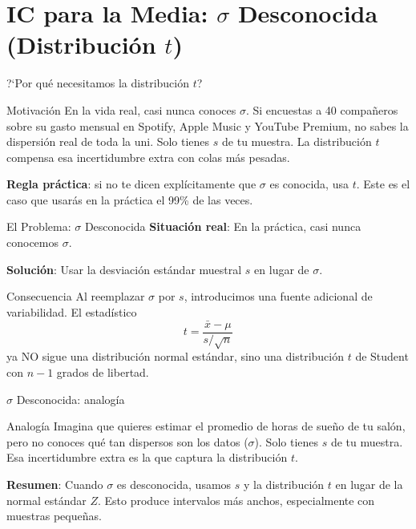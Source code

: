 \documentclass[aspectratio=169, 11pt]{beamer}
\begin{document}
\section{IC para la Media: $\sigma$ Desconocida (Distribución $t$)}

\begin{frame}{?`Por qu\'e necesitamos la distribuci\'on $t$?}
\begin{exampleblock}{Motivaci\'on}
En la vida real, \alert{casi nunca} conoces $\sigma$. Si encuestas a 40 compa\~neros sobre su gasto mensual en Spotify, Apple Music y YouTube Premium, no sabes la dispersi\'on real de toda la uni. Solo tienes $s$ de tu muestra. La distribuci\'on $t$ compensa esa incertidumbre extra con colas m\'as pesadas.
\end{exampleblock}

\textbf{Regla pr\'actica}: si no te dicen expl\'icitamente que $\sigma$ es conocida, \alert{usa $t$}. Este es el caso que usar\'as en la pr\'actica el 99\% de las veces.
\end{frame}

\begin{frame}{El Problema: $\sigma$ Desconocida}
\textbf{Situaci\'on real}: En la pr\'actica, \alert{casi nunca} conocemos $\sigma$.

\vspace{0.2cm}
\textbf{Soluci\'on}: Usar la desviaci\'on est\'andar muestral $s$ en lugar de $\sigma$.

\vspace{0.2cm}
\begin{block}{Consecuencia}
Al reemplazar $\sigma$ por $s$, introducimos una fuente adicional de variabilidad. El estad\'istico
\[
t = \frac{\bar{x} - \mu}{s/\sqrt{n}}
\]
ya NO sigue una distribuci\'on normal est\'andar, sino una \alert{distribuci\'on $t$ de Student} con $n-1$ grados de libertad.
\end{block}
\end{frame}

\begin{frame}{$\sigma$ Desconocida: analog\'ia}
\begin{exampleblock}{Analog\'ia}
Imagina que quieres estimar el promedio de horas de sue\~no de tu sal\'on, pero no conoces qu\'e tan dispersos son los datos ($\sigma$). Solo tienes $s$ de tu muestra. Esa incertidumbre extra es la que captura la distribuci\'on $t$.
\end{exampleblock}

\vspace{0.5em}
\textbf{Resumen}: Cuando $\sigma$ es desconocida, usamos $s$ y la distribuci\'on $t$ en lugar de la normal est\'andar $Z$. Esto produce intervalos m\'as anchos, especialmente con muestras peque\~nas.
\end{frame}
\end{document}
